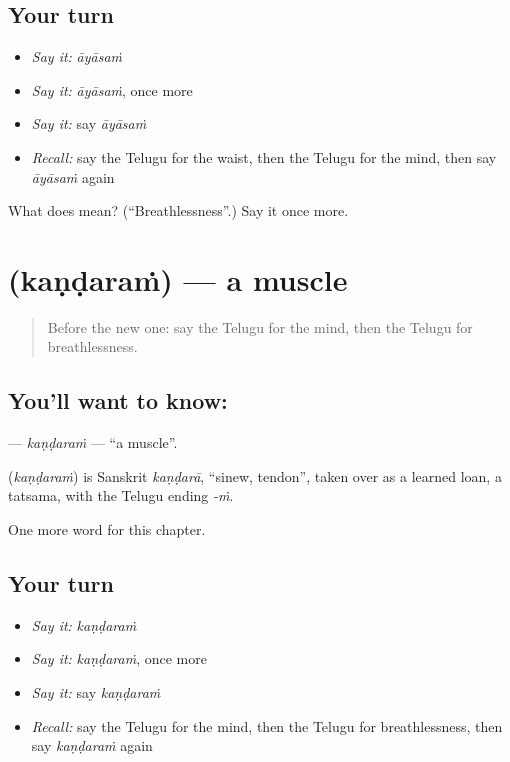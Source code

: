 \subsection*{Your turn}
\begin{itemize}
\raggedright
  \item \emph{Say it:} \emph{āyāsaṁ}
  \item \emph{Say it:} \emph{āyāsaṁ}, once more
  \item \emph{Say it:} say \emph{āyāsaṁ}
  \item \emph{Recall:} say the Telugu for the waist, then the Telugu for the mind, then say \emph{āyāsaṁ} again
\end{itemize}

\begin{tcolorbox}[breakable,colback=teal!4,colframe=teal!35!black,title={Before you move on}]
What does  mean? (\textquotedblleft{}Breathlessness\textquotedblright{}.) Say it once more.
\end{tcolorbox}
\section[\texorpdfstring{\te{కండరం} (kaṇḍaraṁ)}{కండరం (kaṇḍaraṁ)}]{ (kaṇḍaraṁ) — a muscle}

\label{lesson:TE-C251-kandaram}



\begin{quote}
Before the new one: say the Telugu for the mind, then the Telugu for breathlessness.
\end{quote}

\subsection*{You'll want to know: }
\textbf{} — \emph{kaṇḍaraṁ} — \textquotedblleft{}a muscle\textquotedblright{}.

\begin{cousinweb}
\textbf{} (\emph{kaṇḍaraṁ}) is Sanskrit \emph{kaṇḍarā}, \textquotedblleft{}sinew, tendon\textquotedblright{}, taken over as a learned loan, a tatsama, with the Telugu ending \emph{-ṁ}.
\end{cousinweb}

\begin{grammarlens}[title={What you've built}]
One more word for this chapter.
\end{grammarlens}

\subsection*{Your turn}
\begin{itemize}
\raggedright
  \item \emph{Say it:} \emph{kaṇḍaraṁ}
  \item \emph{Say it:} \emph{kaṇḍaraṁ}, once more
  \item \emph{Say it:} say \emph{kaṇḍaraṁ}
  \item \emph{Recall:} say the Telugu for the mind, then the Telugu for breathlessness, then say \emph{kaṇḍaraṁ} again
\end{itemize}

